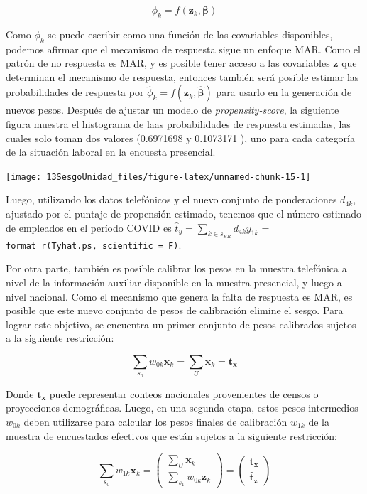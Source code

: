 \documentclass[
  12pt,
  spanish,
]{book}
\begin{document}
\[
{\phi}_k = f(\mathbf{z}_k, {\boldsymbol{\beta}})   
\]

Como \(\phi_k\) se puede escribir como una función de las covariables disponibles, podemos afirmar que el mecanismo de respuesta sigue un enfoque MAR. Como el patrón de no respuesta es MAR, y es posible tener acceso a las covariables \(\mathbf{z}\) que determinan el mecanismo de respuesta, entonces también será posible estimar las probabilidades de respuesta por \(\hat{\phi}_k = f(\mathbf{z }_k, \hat{\boldsymbol{\beta}})\) para usarlo en la generación de nuevos pesos. Después de ajustar un modelo de \emph{propensity-score}, la siguiente figura muestra el histograma de laas probabilidades de respuesta estimadas, las cuales solo toman dos valores (0.6971698 y 0.1073171 ), uno para cada categoría de la situación laboral en la encuesta presencial.

\begin{center}\texttt{[image: 13SesgoUnidad\_files/figure-latex/unnamed-chunk-15-1]} \end{center}

Luego, utilizando los datos telefónicos y el nuevo conjunto de ponderaciones \(d_{4k}\), ajustado por el puntaje de propensión estimado, tenemos que el número estimado de empleados en el período COVID es \(\hat{t}_y=\sum_{k\in s_{ER}}d_{4k}y_{1k} =\) \texttt{format\ r(Tyhat.ps,\ scientific\ =\ F)}.

Por otra parte, también es posible calibrar los pesos en la muestra telefónica a nivel de la información auxiliar disponible en la muestra presencial, y luego a nivel nacional. Como el mecanismo que genera la falta de respuesta es MAR, es posible que este nuevo conjunto de pesos de calibración elimine el sesgo. Para lograr este objetivo, se encuentra un primer conjunto de pesos calibrados sujetos a la siguiente restricción:

\[
\sum_{s_0}w_{0k}\boldsymbol{x}_{k} = \sum_{U}\boldsymbol{x}_{k} = \mathbf{t_x}
\]

Donde \(\mathbf{t_x}\) puede representar conteos nacionales provenientes de censos o proyecciones demográficas. Luego, en una segunda etapa, estos pesos intermedios \(w_{0k}\) deben utilizarse para calcular los pesos finales de calibración \(w_{1k}\) de la muestra de encuestados efectivos que están sujetos a la siguiente restricción:

\[
\sum_{s_0}w_{1k}\boldsymbol{x}_{k} =
\begin{pmatrix}
\sum_{U}\boldsymbol{x}_{k}\\
\sum_{s_1}w_{0k}\boldsymbol{z}_{k} 
\end{pmatrix} =
\begin{pmatrix}
\mathbf{t_x}\\
\hat{\mathbf{t}}_\mathbf{z}
\end{pmatrix}
\]
\end{document}
